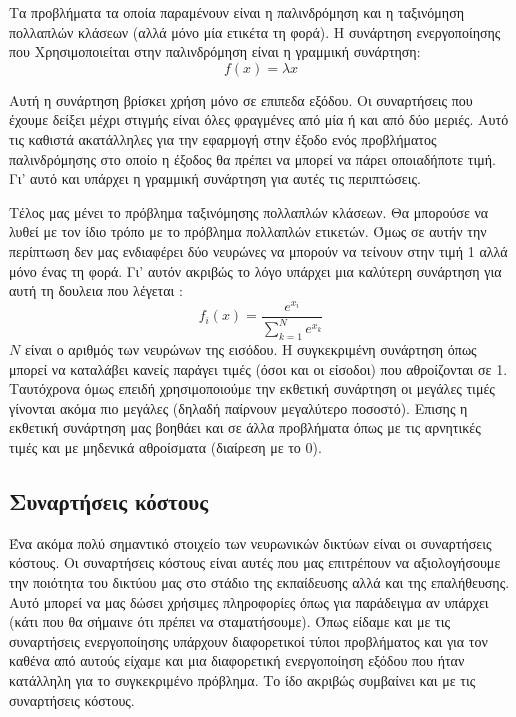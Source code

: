 Τα προβλήματα τα οποία παραμένουν είναι η παλινδρόμηση και η ταξινόμηση πολλαπλών κλάσεων (αλλά μόνο μία ετικέτα τη φορά). Η συνάρτηση ενεργοποίησης που Χρησιμοποιείται στην παλινδρόμηση είναι η γραμμική συνάρτηση:
$$f(x)=\lambda x$$
\begin{figure}[H]
    \centering
    \caption{}
\end{figure}
Αυτή η συνάρτηση βρίσκει χρήση μόνο σε επιπεδα εξόδου. Οι συναρτήσεις που έχουμε δείξει μέχρι στιγμής είναι όλες φραγμένες από μία ή και από δύο μεριές. Αυτό τις καθιστά ακατάλληλες για την εφαρμογή στην έξοδο ενός προβλήματος
παλινδρόμησης στο οποίο η έξοδος θα πρέπει να μπορεί να πάρει οποιαδήποτε τιμή. Γι' αυτό και υπάρχει η γραμμική συνάρτηση για αυτές τις περιπτώσεις.

Τέλος μας μένει το πρόβλημα ταξινόμησης πολλαπλών κλάσεων. Θα μπορούσε να λυθεί με τον ίδιο τρόπο με το πρόβλημα πολλαπλών ετικετών. Όμως σε αυτήν την περίπτωση δεν μας ενδιαφέρει δύο νευρώνες να μπορούν να τείνουν στην τιμή 1 αλλά μόνο
ένας τη φορά. Γι' αυτόν ακριβώς το λόγο υπάρχει μια καλύτερη συνάρτηση για αυτή τη δουλεια που λέγεται :
$$f_i(x)=\frac{e^{x_i}}{\sum\limits_{k=1}^Ne^{x_k}}$$
$N$ είναι ο αριθμός των νευρώνων της εισόδου. Η συγκεκριμένη συνάρτηση όπως μπορεί να καταλάβει κανείς παράγει τιμές (όσοι και οι είσοδοι) που αθροίζονται σε 1. Ταυτόχρονα όμως επειδή χρησιμοποιούμε την εκθετική συνάρτηση οι μεγάλες τιμές
γίνονται ακόμα πιο μεγάλες (δηλαδή παίρνουν μεγαλύτερο ποσοστό). Επισης η εκθετική συνάρτηση μας βοηθάει και σε άλλα προβλήματα όπως με τις αρνητικές τιμές  και με μηδενικά αθροίσματα (διαίρεση με το 0).

\subsection{Συναρτήσεις κόστους}
Ένα ακόμα πολύ σημαντικό στοιχείο των νευρωνικών δικτύων είναι οι συναρτήσεις κόστους. Οι συναρτήσεις κόστους είναι αυτές που μας επιτρέπουν να αξιολογήσουμε την ποιότητα του δικτύου μας στο στάδιο της εκπαίδευσης αλλά και της επαλήθευσης.
Αυτό μπορεί να μας δώσει χρήσιμες πληροφορίες όπως για παράδειγμα αν υπάρχει  (κάτι που θα σήμαινε ότι πρέπει να σταματήσουμε). Όπως είδαμε και με τις συναρτήσεις ενεργοποίησης υπάρχουν διαφορετικοί τύποι προβλήματος και
για τον καθένα από αυτούς είχαμε και μια διαφορετική ενεργοποίηση εξόδου που ήταν κατάλληλη για το συγκεκριμένο πρόβλημα. Το ίδο ακριβώς συμβαίνει και με τις συναρτήσεις κόστους.

